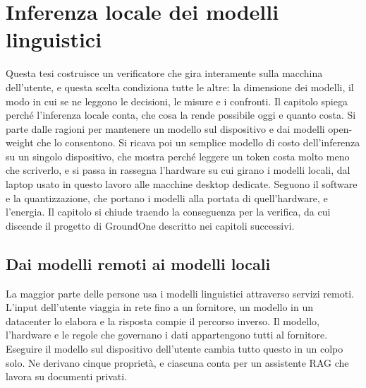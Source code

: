 \chapter{Inferenza locale dei modelli linguistici}
\label{sec:local}


Questa tesi costruisce un verificatore che gira interamente sulla macchina dell'utente, e questa scelta condiziona tutte
le altre: la dimensione dei modelli, il modo in cui se ne leggono le decisioni, le misure e i confronti. Il capitolo
spiega perché l'inferenza locale conta, che cosa la rende possibile oggi e quanto costa. Si parte dalle ragioni per
mantenere un modello sul dispositivo e dai modelli open-weight che lo consentono. Si ricava poi un semplice modello di
costo dell'inferenza su un singolo dispositivo, che mostra perché leggere un token costa molto meno che scriverlo, e si passa
in rassegna l'hardware su cui girano i modelli locali, dal laptop usato in questo lavoro alle macchine desktop dedicate.
Seguono il software e la quantizzazione, che portano i modelli alla portata di quell'hardware, e l'energia. Il capitolo
si chiude traendo la conseguenza per la verifica, da cui discende il progetto di GroundOne descritto nei capitoli
successivi.

\section{Dai modelli remoti ai modelli locali}
\label{sec:local-why}

La maggior parte delle persone usa i modelli linguistici attraverso servizi remoti. L'input dell'utente viaggia in rete
fino a un fornitore, un modello in un datacenter lo elabora e la risposta compie il percorso inverso. Il modello,
l'hardware e le regole che governano i dati appartengono tutti al fornitore. Eseguire il modello sul dispositivo
dell'utente cambia tutto questo in un colpo solo. Ne derivano cinque proprietà, e ciascuna conta per un assistente RAG
che lavora su documenti privati.

